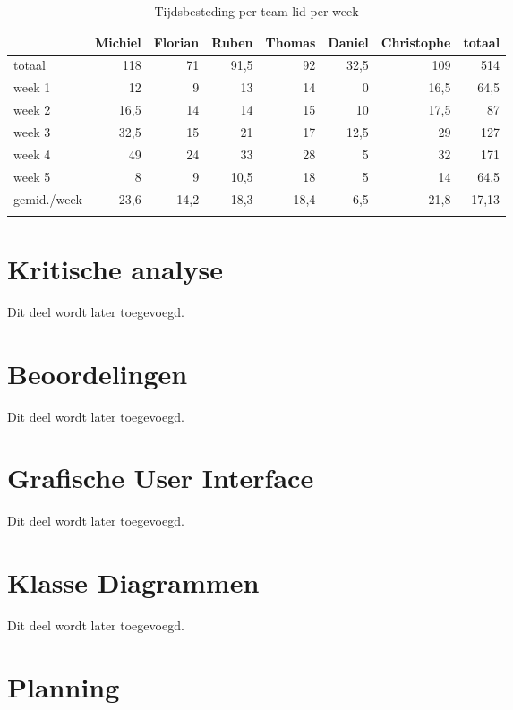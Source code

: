\documentclass[12pt,a4paper]{report}
\begin{document}
\begin{longtable}{l r r r r r r r}
\caption{Tijdsbesteding per team lid per week} \\
\hline\hline
 & Michiel & Florian & Ruben & Thomas & Daniel & Christophe & totaal \\
\hline 
\endfirsthead
totaal & 118 & 71 & 91,5 & 92 & 32,5 & 109 & 514 \\
\hline
week 1 & 12 & 9 & 13 & 14 & 0 & 16,5 & 64,5 \\
week 2 & 16,5 & 14 & 14 & 15 & 10 & 17,5 & 87 \\
week 3 & 32,5 & 15 & 21 & 17 & 12,5 & 29 & 127 \\
week 4 & 49 & 24 & 33 & 28 & 5 & 32 & 171 \\
week 5 & 8 & 9 & 10,5 & 18 & 5 & 14 & 64,5 \\
\hline
gemid./week & 23,6 & 14,2 & 18,3 & 18,4 & 6,5 & 21,8  & 17,13 \\
\label{tab:tijdsregistratie}
\end{longtable}

\chapter{Kritische analyse}

Dit deel wordt later toegevoegd.

\appendix

\chapter{Beoordelingen}

Dit deel wordt later toegevoegd.

\chapter{Grafische User Interface}

Dit deel wordt later toegevoegd.

\chapter{Klasse Diagrammen}

Dit deel wordt later toegevoegd.

\chapter{Planning}
\label{appendix:planning}
\end{document}
